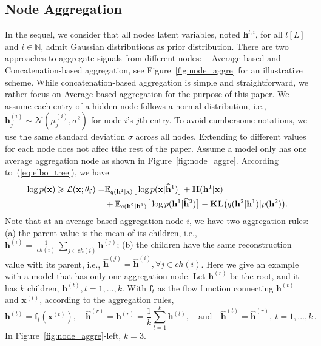 \documentclass{article} %
\begin{document}
\subsection{Node Aggregation}

In the sequel, we consider that all nodes latent variables, noted $\mathbf{h}^{l, i}$, for all $l [L]$ and $i \in \mathbb{N}$, admit Gaussian distributions as prior distribution.
There are two approaches to aggregate signals from different nodes:  \textsc{--} Average-based and \textsc{--} Concatenation-based  aggregation, see Figure~\ref{fig:node_aggre} for an illustrative scheme. 
While concatenation-based aggregation is simple and straightforward, we rather focus on Average-based aggregation for the purpose of this paper. 
We assume each entry of a hidden node follows a normal distribution, i.e., $\mathbf{h}_j^{(i)} \sim \mathcal{N}(\mu_j^{(i)}, \sigma^2)$ for node $i$'s $j$th entry. 
To avoid cumbersome notations, we  use the same standard deviation $\sigma$ across all nodes. Extending to different values for each node does not affec tthe rest of the paper.
Assume a model only has one average aggregation node as shown in Figure~\ref{fig:node_aggre}. According to~(\ref{eq:elbo_tree}), we have
\begin{align} \notag
\log p(\mathbf{x})  \geqslant \mathcal{L}(\mathbf{x}; \theta_{\mathbf{f}})
=&\mathbb{E}_{q(\mathbf{h}^1 | \mathbf{x})} \big[\log p(\mathbf{x}|\widehat{\mathbf{h}}^1)\big] + \mathbf{H}(\mathbf{h}^1 | \mathbf{x})  \\ \label{eq:average}
&+\mathbb{E}_{q(\mathbf{h}^2 | \mathbf{h}^1)} \big[\log p(\mathbf{h}^1|\widehat{\mathbf{h}}^2)\big] - \textbf{\text{KL}}\big(q(\mathbf{h}^2 | \mathbf{h}^1) | p(\mathbf{h}^2)\big).
\end{align} 
Note that at an average-based aggregation node $i$, we have two aggregation rules: (a) the parent value is the mean of its children, i.e., $\mathbf{h}^{(i)} = \frac{1}{|ch(i)|} \sum_{j \in ch(i)} \mathbf{h}^{(j)}$; (b) the  children have the same reconstruction value with its parent, i.e., $\widehat{\mathbf{h}}^{(j)} = \widehat{\mathbf{h}}^{(i)}, \forall j \in ch(i)$. Here we give an example with a model that has only  one aggregation node.  Let $\mathbf{h}^{(r)}$ be the root, and it has $k$ children, $\mathbf{h}^{(t)}, t = 1,...,k$. With $\mathbf{f}_t$ as the flow function connecting $\mathbf{h}^{(t)}$ and $\mathbf{x}^{(t)}$, according to the aggregation rules, $$ \mathbf{h}^{(t)} = \mathbf{f}_t(\mathbf{x}^{(t)}),\quad \widehat{\mathbf{h}}^{(r)} = \mathbf{h}^{(r)} = \frac{1}{k}\sum_{t=1}^k \mathbf{h}^{(t)}, \quad \textrm{and} \quad  \widehat{\mathbf{h}}^{(t)}= \widehat{\mathbf{h}}^{(r)}, \ t = 1,...,k \, .$$
In Figure~\ref{fig:node_aggre}-left, $k=3$. 
\end{document}
